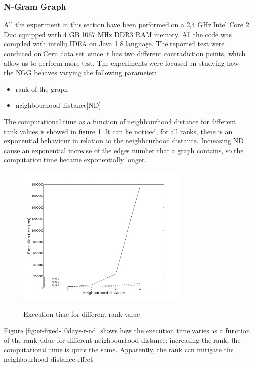 \subsubsection*{N-Gram Graph }
All the experiment in this section have been performed on a 2,4 GHz Intel Core 2
Duo equipped with 4 GB 1067 MHz DDR3 RAM memory.
All the code was compiled with intellij IDEA on Java 1.8 language. 
The reported test were conduced on Cern data set, since it has two different
contradiction points, which allow us to perform more test. The experiments were
focused on studying how the NGG behaves varying the following parameter:
\begin{itemize}
	\item rank of the graph
	\item neighbourhood distance[ND]
\end{itemize}

The computational time as a function of neighbourhood distance for different
rank values is showed in figure \ref{fig:et-fixed-10days-r-rank}.
It can be noticed, for all ranks, there is an exponential behaviour in relation to the neighbourhood distance. 
Increasing ND cause an exponential increase of the edges number that a graph contains, so the computation time became exponentially longer.

\begin{figure}[htbp]
	\centering
			{\includegraphics[width=8.5cm,height=7cm]{image/win_2_ranks.pdf}}	
		\caption[et-fixed-10days-r-rank]{Execution time for different rank value}
	\label{fig:et-fixed-10days-r-rank}
\end{figure} 

Figure \ref{fig:et-fixed-10days-r-nd} shows how the execution time varies as a
function of the rank value for different neighbourhood distance;
increasing the rank, the computational time is quite the same.
Apparently, the rank can mitigate the neighbourhood distance effect.

